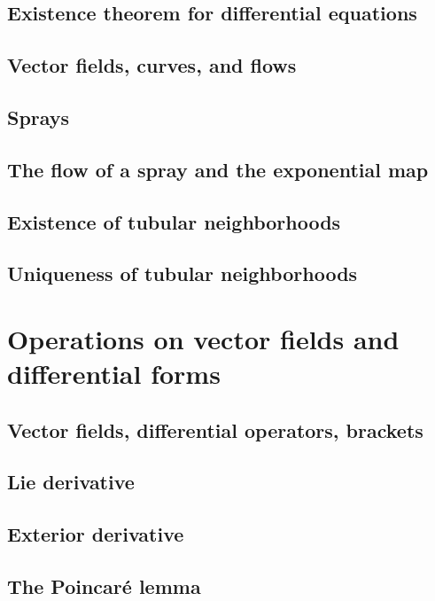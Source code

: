 \documentclass[a4paper]{article}
\begin{document}
\subsection{Existence theorem for differential equations}

\subsection{Vector fields, curves, and flows}

\subsection{Sprays}

\subsection{The flow of a spray and the exponential map}

\subsection{Existence of tubular neighborhoods}

\subsection{Uniqueness of tubular neighborhoods}

\section{Operations on vector fields and differential forms}

\subsection{Vector fields, differential operators, brackets}

\subsection{Lie derivative}

\subsection{Exterior derivative}

\subsection{The Poincar\'e lemma}
\end{document}
